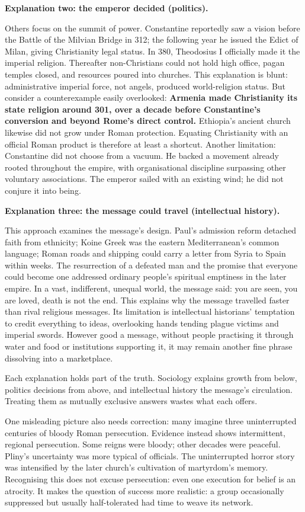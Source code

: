 \textbf{Explanation two: the emperor decided (politics).}

Others focus on the summit of power. Constantine reportedly saw a vision before the Battle of the Milvian Bridge in 312; the following year he issued the Edict of Milan, giving Christianity legal status. In 380, Theodosius I officially made it the imperial religion. Thereafter non-Christians could not hold high office, pagan temples closed, and resources poured into churches. This explanation is blunt: administrative imperial force, not angels, produced world-religion status. But consider a counterexample easily overlooked: \textbf{Armenia made Christianity its state religion around 301, over a decade before Constantine's conversion and beyond Rome's direct control.} Ethiopia's ancient church likewise did not grow under Roman protection. Equating Christianity with an official Roman product is therefore at least a shortcut. Another limitation: Constantine did not choose from a vacuum. He backed a movement already rooted throughout the empire, with organisational discipline surpassing other voluntary associations. The emperor sailed with an existing wind; he did not conjure it into being.

\textbf{Explanation three: the message could travel (intellectual history).}

This approach examines the message's design. Paul's admission reform detached faith from ethnicity; Koine Greek was the eastern Mediterranean's common language; Roman roads and shipping could carry a letter from Syria to Spain within weeks. The resurrection of a defeated man and the promise that everyone could become one addressed ordinary people's spiritual emptiness in the later empire. In a vast, indifferent, unequal world, the message said: you are seen, you are loved, death is not the end. This explains why the message travelled faster than rival religious messages. Its limitation is intellectual historians' temptation to credit everything to ideas, overlooking hands tending plague victims and imperial swords. However good a message, without people practising it through water and food or institutions supporting it, it may remain another fine phrase dissolving into a marketplace.

Each explanation holds part of the truth. Sociology explains growth from below, politics decisions from above, and intellectual history the message's circulation. Treating them as mutually exclusive answers wastes what each offers.

One misleading picture also needs correction: many imagine three uninterrupted centuries of bloody Roman persecution. Evidence instead shows intermittent, regional persecution. Some reigns were bloody; other decades were peaceful. Pliny's uncertainty was more typical of officials. The uninterrupted horror story was intensified by the later church's cultivation of martyrdom's memory. Recognising this does not excuse persecution: even one execution for belief is an atrocity. It makes the question of success more realistic: a group occasionally suppressed but usually half-tolerated had time to weave its network.


